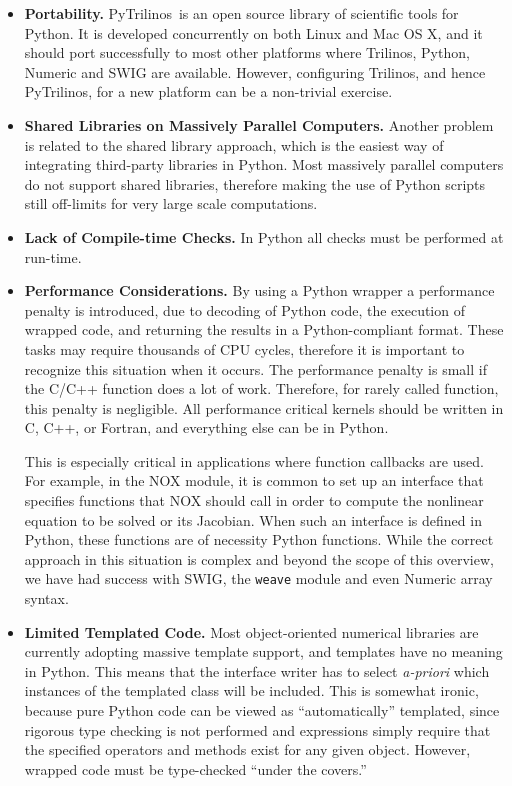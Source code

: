 \documentclass[10pt,relax]{SANDreport}
\newcommand{\PyTrilinos}{{PyTrilinos}}
\begin{document}
\begin{itemize}

\item {\bf Portability.} \PyTrilinos\ is an open source library of
  scientific tools for Python.  It is developed concurrently on both
  Linux and Mac OS X, and it should port successfully to most other
  platforms where Trilinos, Python, Numeric and SWIG are
  available. However, configuring Trilinos, and hence \PyTrilinos, for
  a new platform can be a non-trivial exercise.

\item {\bf Shared Libraries on Massively Parallel Computers.} Another
  problem is related to the shared library approach, which is the
  easiest way of integrating third-party libraries in Python. Most
  massively parallel computers do not support shared libraries,
  therefore making the use of Python scripts still off-limits for very
  large scale computations.

\item {\bf Lack of Compile-time Checks.} In Python all checks must be
  performed at run-time.

\item {\bf Performance Considerations.}  By using a Python wrapper a
  performance penalty is introduced, due to decoding of Python code,
  the execution of wrapped code, and returning the results in a
  Python-compliant format. These tasks may require thousands of CPU
  cycles, therefore it is important to recognize this situation when
  it occurs.  The performance penalty is small if the C/C++ function
  does a lot of work.  Therefore, for rarely called function, this
  penalty is negligible.  All performance critical kernels should be
  written in C, C++, or Fortran, and everything else can be in Python.

  This is especially critical in applications where function callbacks
  are used.  For example, in the NOX module, it is common to set up an
  interface that specifies functions that NOX should call in order to
  compute the nonlinear equation to be solved or its Jacobian.  When
  such an interface is defined in Python, these functions are of
  necessity Python functions.  While the correct approach in this
  situation is complex and beyond the scope of this overview, we have
  had success with SWIG, the {\tt weave} module and even Numeric array
  syntax.

\item {\bf Limited Templated Code.} Most object-oriented numerical
  libraries are currently adopting massive template support, and
  templates have no meaning in Python.  This means that the interface
  writer has to select {\sl a-priori} which instances of the templated
  class will be included.  This is somewhat ironic, because pure
  Python code can be viewed as ``automatically'' templated, since
  rigorous type checking is not performed and expressions simply
  require that the specified operators and methods exist for any given
  object.  However, wrapped code must be type-checked ``under the
  covers.''

\end{itemize}
\end{document}
